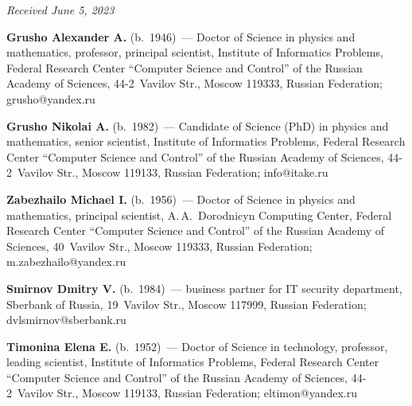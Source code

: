 \hfill{\small\textit{Received June 5, 2023}} 

\vspace*{-12pt}

\Contr

\noindent
\textbf{Grusho Alexander A.} (b.\ 1946)~--- Doctor of Science in physics and mathematics, professor, 
principal scientist, Institute of Informatics Problems, Federal Research Center ``Computer Science and 
Control'' of the Russian Academy of Sciences, 44-2~Vavilov Str., Moscow 119333, Russian 
Federation; \mbox{grusho@yandex.ru}

\vspace*{3pt}

\noindent
\textbf{Grusho Nikolai A.} (b.\ 1982)~--- Candidate of Science (PhD) in physics and mathematics, 
senior scientist, Institute of Informatics Problems, Federal Research Center ``Computer Science and 
Control'' of the Russian Academy of Sciences, 44-2~Vavilov Str., Moscow 119133, Russian 
Federation; \mbox{info@itake.ru}

\vspace*{3pt}

\noindent
\textbf{Zabezhailo Michael I.} (b.\ 1956)~--- Doctor of Science in physics and mathematics, principal 
scientist, A.\,A.~Dorodnicyn Computing Center, Federal Research Center ``Computer Science and 
Control'' of the Russian Academy of Sciences, 40~Vavilov Str., Moscow 119333, Russian Federation; 
\mbox{m.zabezhailo@yandex.ru}

\vspace*{3pt}

\noindent
\textbf{Smirnov Dmitry V.} (b.\ 1984)~--- business partner for IT security department, Sberbank of 
Russia, 19~Vavilov Str., Moscow 117999, Russian Federation; \mbox{dvlsmirnov@sberbank.ru}

\vspace*{3pt}

\noindent
\textbf{Timonina Elena E.} (b.\ 1952)~--- Doctor of Science in technology, professor, leading scientist, 
Institute of Informatics Problems, Federal Research Center ``Computer Science and Control'' of the 
Russian Academy of Sciences, 44-2~Vavilov Str., Moscow 119133, Russian Federation; 
\mbox{eltimon@yandex.ru}



\label{end\stat}

\renewcommand{\bibname}{\protect\rm Литература} 